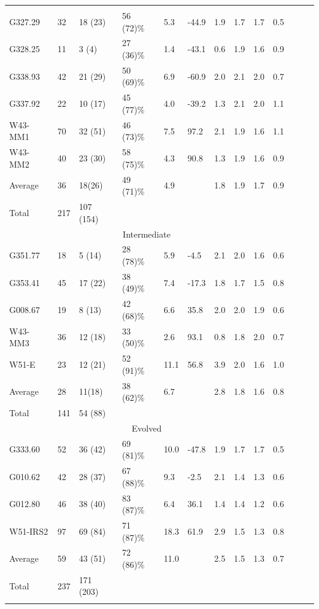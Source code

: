 \begin{table}[htbp!]
\begin{threeparttable}[c]
\begin{tabular}{lllllllllllll}
\hline \noalign {\smallskip}
\multicolumn{10}{c}{Young} \\
G327.29 & 32 & 18 (23)&  56 (72)\% & 5.3 & -44.9 & 1.9  & 1.7 & 1.7 & 0.5 \\
G328.25 & 11 & 3 (4)&  27 (36)\% & 1.4 & -43.1 & 0.6  & 1.9 & 1.6 & 0.9 \\
G338.93 & 42 & 21 (29)&  50 (69)\% & 6.9 & -60.9 & 2.0  & 2.1 & 2.0 & 0.7 \\
G337.92 & 22 & 10 (17)&  45 (77)\% & 4.0 & -39.2 & 1.3  & 2.1 & 2.0 & 1.1 \\
W43-MM1 & 70 & 32 (51)&  46 (73)\% & 7.5 & 97.2 & 2.1  & 1.9 & 1.6 & 1.1 \\
W43-MM2 & 40 & 23 (30)&  58 (75)\% & 4.3 & 90.8 & 1.3  & 1.9 & 1.6 & 0.9 \\
Average &  36 & 18(26) & 49 (71)\% &  4.9 &  & 1.8  & 1.9 & 1.7 & 0.9 \\
Total &  217 & 107 (154)  \\
\hline
\multicolumn{10}{c}{Intermediate} \\
G351.77 & 18 & 5 (14)&  28 (78)\% & 5.9 & -4.5 & 2.1  & 2.0 & 1.6 & 0.6 \\
G353.41 & 45 & 17 (22)&  38 (49)\% & 7.4 & -17.3 & 1.8  & 1.7 & 1.5 & 0.8 \\
G008.67 & 19 & 8 (13)&  42 (68)\% & 6.6 & 35.8 & 2.0  & 2.0 & 1.9 & 0.6 \\
W43-MM3 & 36 & 12 (18)&  33 (50)\% & 2.6 & 93.1 & 0.8  & 1.8 & 2.0 & 0.7 \\
W51-E & 23 & 12 (21)&  52 (91)\% & 11.1 & 56.8 & 3.9  & 2.0 & 1.6 & 1.0 \\
Average &  28 & 11(18) & 38 (62)\% &  6.7 &  & 2.8  & 1.8 & 1.6 & 0.8 \\
Total &  141 & 54 (88)  \\
\hline
\multicolumn{10}{c}{Evolved} \\
G333.60 &  52 & 36 (42) &  69 (81)\% & 10.0 & -47.8 & 1.9  & 1.7 & 1.7 & 0.5 \\
G010.62 &  42 & 28 (37) &  67 (88)\% & 9.3 & -2.5 & 2.1  & 1.4 & 1.3 & 0.6 \\
G012.80 &  46 & 38 (40) &  83 (87)\% & 6.4 & 36.1 & 1.4  & 1.4 & 1.2 & 0.6 \\
W51-IRS2 &  97 & 69 (84) &  71 (87)\% & 18.3 & 61.9 & 2.9  & 1.5 & 1.3 & 0.8 \\
Average &  59 & 43 (51) & 72 (86)\% &  11.0 &  & 2.5  & 1.5 & 1.3 & 0.7 \\
Total &  237 & 171 (203)  \\
\hline \noalign {\smallskip}
\end{tabular}

\end{threeparttable}
\end{table}
